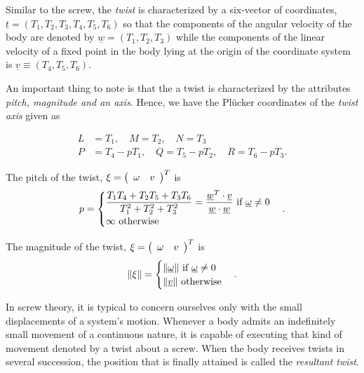 Similar to the screw, the \textit{twist} is characterized by a six-vector of coordinates, $\underline{t}=(T_1, T_2, T_3, T_4, T_5, T_6)$ so that the components of the angular velocity of the body are denoted by $\underline{w}=(T_1, T_2, T_3)$ while the components of the linear velocity of a fixed point in the body lying at the origin of the coordinate system is $\underline{v}\equiv(T_4, T_5, T_6)$. 

An important thing to note is that the a twist is characterized by the attributes \textit{pitch, magnitude and an axis}.  Hence, we have the Pl\"ucker coordinates of the \textit{twist axis} given as
%
\begin{definition}
	
	\begin{subequations}
		\begin{align}
		L &= T_1,\quad M=T_2, \quad N=T_3 \\
		P &= T_4 - pT_1, \quad Q=T_5-pT_2, \quad R = T_6 - pT_3.
		\end{align}
	\end{subequations}
\end{definition}
%
\begin{definition}
	The pitch of the twist, $\xi = \left(\begin{array}{cc}
	\omega & v
	\end{array}\right)^T$ is 
	\begin{align}
	p = \begin{cases}\dfrac{T_1T_4+T_2T_5+T_3T_6}{T_1^2+T_2^2+T_3^2} = \dfrac{\underline{w}^T\cdot \underline
			{v}}{\underline{w}\cdot \underline{w} } \text{ if } \underline{\omega} \neq 0\\\infty \text{ otherwise}\end{cases} .
	\label{eq:twist_pitch}
	\end{align}
\end{definition}
%
\begin{definition}
	The magnitude of the twist, $\xi = \left(\begin{array}{cc}
	\omega & v
	\end{array}\right)^T$ is 
	\begin{align}
	\|\xi \| = \begin{cases}\|\underline{\omega}\| \text{ if } \underline{\omega}\neq 0\\\|\underline{v}\| \text{ otherwise}\end{cases} .
	\label{eq:twist_mag}
	\end{align}
\end{definition}


In screw theory, it is typical to concern ourselves only with the small displacements of a system's motion. Whenever a body admits an indefinitely small movement of a continuous nature, it is capable of executing that kind of movement denoted by a twist about a screw. When the body receives twists in several succession, the position that is finally attained is called the \textit{resultant twist}.

